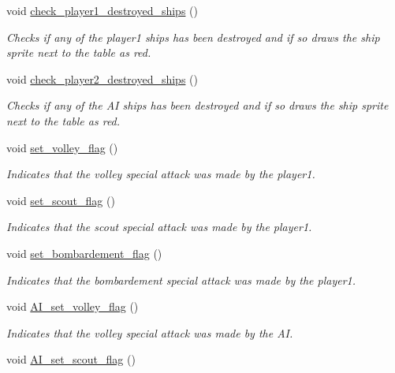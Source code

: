 \begin{DoxyCompactItemize}
void \hyperlink{group___commodore_ga2f4cdc14245eec40f4c21ff2b1a42190}{check\-\_\-player1\-\_\-destroyed\-\_\-ships} ()
\begin{DoxyCompactList}\small\item\em Checks if any of the player1 ships has been destroyed and if so draws the ship sprite next to the table as red. \end{DoxyCompactList}\item 
void \hyperlink{group___commodore_ga029a83658f8dc0ea3f744b96b68dfdb4}{check\-\_\-player2\-\_\-destroyed\-\_\-ships} ()
\begin{DoxyCompactList}\small\item\em Checks if any of the A\-I ships has been destroyed and if so draws the ship sprite next to the table as red. \end{DoxyCompactList}\item 
void \hyperlink{group___commodore_ga3110becf7dc1f5fc702fe102b34400d7}{set\-\_\-volley\-\_\-flag} ()
\begin{DoxyCompactList}\small\item\em Indicates that the volley special attack was made by the player1. \end{DoxyCompactList}\item 
void \hyperlink{group___commodore_ga8813f78b0a4efd6f12c125064495ed59}{set\-\_\-scout\-\_\-flag} ()
\begin{DoxyCompactList}\small\item\em Indicates that the scout special attack was made by the player1. \end{DoxyCompactList}\item 
void \hyperlink{group___commodore_gaa6b0c72b3ee0a3d97a45d38055342398}{set\-\_\-bombardement\-\_\-flag} ()
\begin{DoxyCompactList}\small\item\em Indicates that the bombardement special attack was made by the player1. \end{DoxyCompactList}\item 
void \hyperlink{group___commodore_ga54fcebfeda2535273c3dd47473e46b5a}{A\-I\-\_\-set\-\_\-volley\-\_\-flag} ()
\begin{DoxyCompactList}\small\item\em Indicates that the volley special attack was made by the A\-I. \end{DoxyCompactList}\item 
void \hyperlink{group___commodore_ga2be5f22e407ffc7887adf8cc7ba5f54a}{A\-I\-\_\-set\-\_\-scout\-\_\-flag} ()

\end{DoxyCompactItemize}
